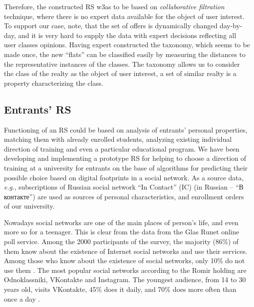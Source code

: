 \documentclass[conference]{IEEEtran}
\begin{document}
Therefore, the constructed RS w3as to be based on \emph{collaborative filtration} technique, where there is no expert data available for the object of user interest.  To support our case, note, that the set of offers is dynamically changed day-by-day, and it is very hard to supply the data with expert decisions reflecting all user classes opinions.  Having expert constructed the taxonomy, which seems to be made once, the new ``flats'' can be classified easily by measuring the distances to the representative instances of the classes.  The taxonomy allows us to consider the class of the realty as the object of user interest, a set of similar realty is a property characterizing the class.

\subsection{Entrants' RS}

Functioning of an RS could be based on analysis of entrants' personal properties, matching them with already enrolled students, analyzing existing individual direction of training and even a particular educational program.  We have been developing and implementing a prototype RS for helping to choose a direction of training at a university for entrants on the base of algorithms for predicting their possible choice based on digital footprints in a social network. As a source data, \emph{e.g.}, subscriptions of Russian social network ``In Contact'' (IC) (in Russian -- ``В контакте'') are used as sources of personal characteristics, and enrollment orders of our university.  %

Nowadays social networks are one of the main places of person's life, and even more so for a teenager.  This is clear from the data from the Glas Runet online poll service.  Among the 2000 participants of the survey, the majority (86\%) of them know about the existence of Internet social networks and use their services.  Among those who know about the existence of social networks, only 10\% do not use them \cite{c2}.
The most popular social networks according to the Romir holding are Odnoklassniki, VKontakte and Instagram.  The youngest audience, from 14 to 30 years old, visits VKontakte, 45\% does it daily, and 70\% does more often than once a day \cite{c6}.
\end{document}

